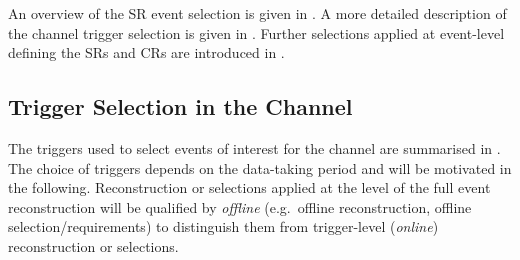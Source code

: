 An overview of the SR event selection is given in . A
more detailed description of the \hadhad channel trigger selection is given in
. Further selections applied at event-level
defining the SRs and CRs are introduced in .

\begin{table}[htbp]
  \centering

  \caption{SR event selection for the \hadhad, \lephad SLT, and \lephad LTT
    channel. Trigger-dependent thresholds are applied to the \pT of electrons,
    muons, and \tauhadvis. Where applicable, the range of these thresholds is
    listed. For events selected by DTTs and LTTs, the requirements on jets in
    the central region are trigger-dependent, and thus not given in this
    table. For the \hadhad channel, these requirements are described in
    . Jets in the forward region are not used
    for event selection purposes.
    The table is adapted from Ref.~\cite{HDBS-2018-40}.}%
  \label{tab:event_selection}

  \resizebox{\textwidth}{!}{
    
  }
\end{table}


\subsection{Trigger Selection in the \hadhad Channel}%
\label{sec:trigger}%
\label{sec:hadhad_trigger_selection}

The triggers used to select events of interest for the \hadhad channel
are summarised in . The choice of triggers
depends on the data-taking period and will be motivated in the
following. Reconstruction or selections applied at the level of the
full event reconstruction will be qualified by \emph{offline} (e.g.\
offline reconstruction, offline selection/requirements) to distinguish
them from trigger-level (\emph{online}) reconstruction or selections.

